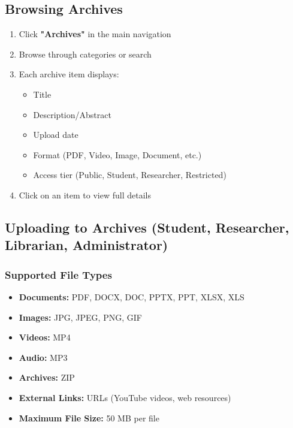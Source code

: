 \documentclass[12pt,a4paper]{article}
\begin{document}
\subsection{Browsing Archives}
\begin{enumerate}[leftmargin=*]
    \item Click \textbf{"Archives"} in the main navigation
    \item Browse through categories or search
    \item Each archive item displays:
        \begin{itemize}
            \item Title
            \item Description/Abstract
            \item Upload date
            \item Format (PDF, Video, Image, Document, etc.)
            \item Access tier (Public, Student, Researcher, Restricted)
        \end{itemize}
    \item Click on an item to view full details
\end{enumerate}

\subsection{Uploading to Archives (Student, Researcher, Librarian, Administrator)}

\subsubsection{Supported File Types}
\begin{itemize}[leftmargin=*]
    \item \textbf{Documents:} PDF, DOCX, DOC, PPTX, PPT, XLSX, XLS
    \item \textbf{Images:} JPG, JPEG, PNG, GIF
    \item \textbf{Videos:} MP4
    \item \textbf{Audio:} MP3
    \item \textbf{Archives:} ZIP
    \item \textbf{External Links:} URLs (YouTube videos, web resources)
    \item \textbf{Maximum File Size:} 50 MB per file
\end{itemize}
\end{document}
